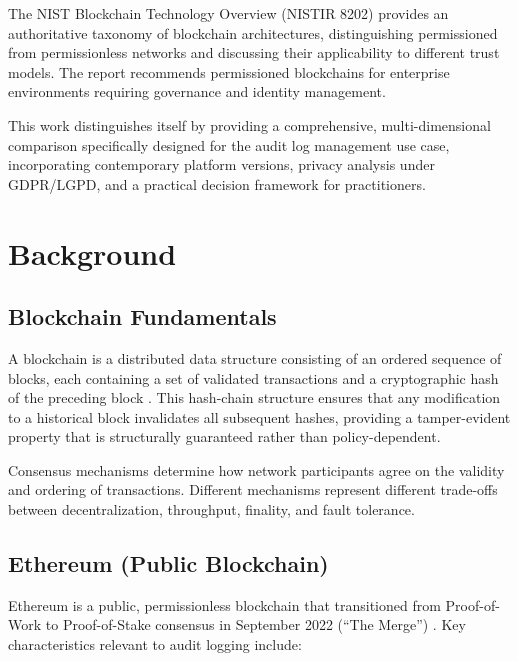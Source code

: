 \documentclass[12pt,a4paper]{article}
\begin{document}
The NIST Blockchain Technology Overview (NISTIR 8202) \cite{nist2018blockchain} provides an authoritative taxonomy of blockchain architectures, distinguishing permissioned from permissionless networks and discussing their applicability to different trust models. The report recommends permissioned blockchains for enterprise environments requiring governance and identity management.

This work distinguishes itself by providing a comprehensive, multi-dimensional comparison specifically designed for the audit log management use case, incorporating contemporary platform versions, privacy analysis under GDPR/LGPD, and a practical decision framework for practitioners.

\section{Background}
\label{sec:background}

\subsection{Blockchain Fundamentals}

A blockchain is a distributed data structure consisting of an ordered sequence of blocks, each containing a set of validated transactions and a cryptographic hash of the preceding block \cite{nakamoto2008}. This hash-chain structure ensures that any modification to a historical block invalidates all subsequent hashes, providing a tamper-evident property that is structurally guaranteed rather than policy-dependent.

Consensus mechanisms determine how network participants agree on the validity and ordering of transactions. Different mechanisms represent different trade-offs between decentralization, throughput, finality, and fault tolerance.

\subsection{Ethereum (Public Blockchain)}

Ethereum is a public, permissionless blockchain that transitioned from Proof-of-Work to Proof-of-Stake consensus in September 2022 (``The Merge'') \cite{ethereum2024}. Key characteristics relevant to audit logging include:
\end{document}
